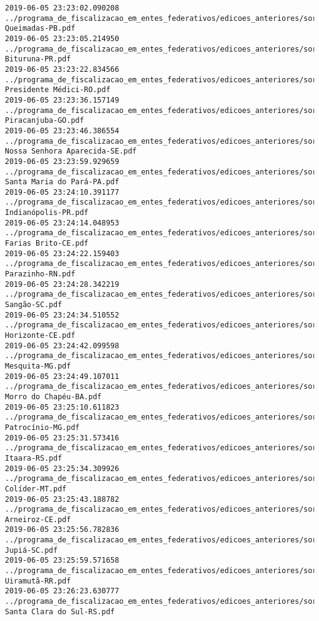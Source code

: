 \begin{lstlisting}
2019-06-05 23:23:02.090208 ../programa_de_fiscalizacao_em_entes_federativos/edicoes_anteriores/sorteio_35/1914-Queimadas-PB.pdf
2019-06-05 23:23:05.214950 ../programa_de_fiscalizacao_em_entes_federativos/edicoes_anteriores/sorteio_35/1921-Bituruna-PR.pdf
2019-06-05 23:23:22.834566 ../programa_de_fiscalizacao_em_entes_federativos/edicoes_anteriores/sorteio_35/1928-Presidente Médici-RO.pdf
2019-06-05 23:23:36.157149 ../programa_de_fiscalizacao_em_entes_federativos/edicoes_anteriores/sorteio_35/1898-Piracanjuba-GO.pdf
2019-06-05 23:23:46.386554 ../programa_de_fiscalizacao_em_entes_federativos/edicoes_anteriores/sorteio_35/1937-Nossa Senhora Aparecida-SE.pdf
2019-06-05 23:23:59.929659 ../programa_de_fiscalizacao_em_entes_federativos/edicoes_anteriores/sorteio_35/1912-Santa Maria do Pará-PA.pdf
2019-06-05 23:24:10.391177 ../programa_de_fiscalizacao_em_entes_federativos/edicoes_anteriores/sorteio_35/1922-Indianópolis-PR.pdf
2019-06-05 23:24:14.048953 ../programa_de_fiscalizacao_em_entes_federativos/edicoes_anteriores/sorteio_35/1892-Farias Brito-CE.pdf
2019-06-05 23:24:22.159403 ../programa_de_fiscalizacao_em_entes_federativos/edicoes_anteriores/sorteio_35/1926-Parazinho-RN.pdf
2019-06-05 23:24:28.342219 ../programa_de_fiscalizacao_em_entes_federativos/edicoes_anteriores/sorteio_35/1935-Sangão-SC.pdf
2019-06-05 23:24:34.510552 ../programa_de_fiscalizacao_em_entes_federativos/edicoes_anteriores/sorteio_35/1893-Horizonte-CE.pdf
2019-06-05 23:24:42.099598 ../programa_de_fiscalizacao_em_entes_federativos/edicoes_anteriores/sorteio_35/1905-Mesquita-MG.pdf
2019-06-05 23:24:49.107011 ../programa_de_fiscalizacao_em_entes_federativos/edicoes_anteriores/sorteio_35/1887-Morro do Chapéu-BA.pdf
2019-06-05 23:25:10.611823 ../programa_de_fiscalizacao_em_entes_federativos/edicoes_anteriores/sorteio_35/1906-Patrocínio-MG.pdf
2019-06-05 23:25:31.573416 ../programa_de_fiscalizacao_em_entes_federativos/edicoes_anteriores/sorteio_35/1931-Itaara-RS.pdf
2019-06-05 23:25:34.309926 ../programa_de_fiscalizacao_em_entes_federativos/edicoes_anteriores/sorteio_35/1909-Colíder-MT.pdf
2019-06-05 23:25:43.188782 ../programa_de_fiscalizacao_em_entes_federativos/edicoes_anteriores/sorteio_35/1891-Arneiroz-CE.pdf
2019-06-05 23:25:56.782836 ../programa_de_fiscalizacao_em_entes_federativos/edicoes_anteriores/sorteio_35/1934-Jupiá-SC.pdf
2019-06-05 23:25:59.571658 ../programa_de_fiscalizacao_em_entes_federativos/edicoes_anteriores/sorteio_35/1929-Uiramutã-RR.pdf
2019-06-05 23:26:23.630777 ../programa_de_fiscalizacao_em_entes_federativos/edicoes_anteriores/sorteio_35/1933-Santa Clara do Sul-RS.pdf

\end{lstlisting}
